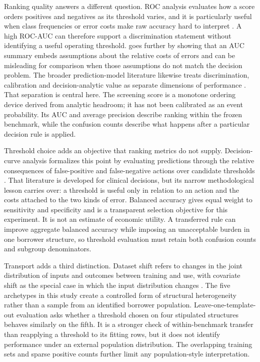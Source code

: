 \documentclass[11pt,a4paper]{article}
\begin{document}
Ranking quality answers a different question. ROC analysis evaluates how a score orders positives and negatives as its threshold varies, and it is particularly useful when class frequencies or error costs make raw accuracy hard to interpret \citep{fawcett2006roc}. A high ROC-AUC can therefore support a discrimination statement without identifying a useful operating threshold. \citet{hand2009auc} goes further by showing that an AUC summary embeds assumptions about the relative costs of errors and can be misleading for comparison when those assumptions do not match the decision problem. The broader prediction-model literature likewise treats discrimination, calibration and decision-analytic value as separate dimensions of performance \citep{steyerberg2010performance}. That separation is central here. The screening score is a monotone ordering device derived from analytic headroom; it has not been calibrated as an event probability. Its AUC and average precision describe ranking within the frozen benchmark, while the confusion counts describe what happens after a particular decision rule is applied.

Threshold choice adds an objective that ranking metrics do not supply. Decision-curve analysis formalizes this point by evaluating predictions through the relative consequences of false-positive and false-negative actions over candidate thresholds \citep{vickers2006decision}. That literature is developed for clinical decisions, but its narrow methodological lesson carries over: a threshold is useful only in relation to an action and the costs attached to the two kinds of error. Balanced accuracy gives equal weight to sensitivity and specificity and is a transparent selection objective for this experiment. It is not an estimate of economic utility. A transferred rule can improve aggregate balanced accuracy while imposing an unacceptable burden in one borrower structure, so threshold evaluation must retain both confusion counts and subgroup denominators.

Transport adds a third distinction. Dataset shift refers to changes in the joint distribution of inputs and outcomes between training and use, with covariate shift as the special case in which the input distribution changes \citep{quinonero2008shift}. The five archetypes in this study create a controlled form of structural heterogeneity rather than a sample from an identified borrower population. Leave-one-template-out evaluation asks whether a threshold chosen on four stipulated structures behaves similarly on the fifth. It is a stronger check of within-benchmark transfer than reapplying a threshold to its fitting rows, but it does not identify performance under an external population distribution. The overlapping training sets and sparse positive counts further limit any population-style interpretation.
\end{document}
